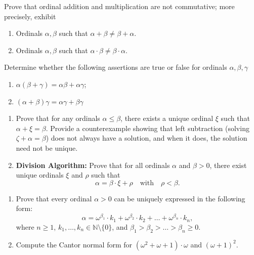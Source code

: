 \begin{exercise}
  Prove that ordinal addition and multiplication are not commutative;
  more precisely, exhibit
  \begin{enumerate}
  \item
    Ordinals $\alpha,\beta$ such that $\alpha+\beta\neq \beta+\alpha$.
  \item
    Ordinals $\alpha,\beta$ such that $\alpha\cdot\beta\neq \beta\cdot\alpha$.
  \end{enumerate}
\end{exercise}

\begin{exercise}
Determine whether the following assertions are true or false for ordinals $\alpha,\beta,\gamma$
  \begin{enumerate}
  \item
    $\alpha(\beta+\gamma)=\alpha\beta+\alpha\gamma$;
  \item
    $(\alpha+\beta)\gamma=\alpha\gamma+\beta\gamma$
  \end{enumerate}
\end{exercise}

\begin{exercise}\hfill
\begin{enumerate}
    \item Prove that for any ordinals $\alpha \le \beta$, there exists a unique ordinal $\xi$ such that $\alpha + \xi = \beta$. Provide a counterexample showing that left subtraction (solving $\zeta + \alpha = \beta$) does not always have a solution, and when it does, the solution need not be unique.
    \item \textbf{Division Algorithm:} Prove that for all ordinals $\alpha$ and $\beta > 0$, there exist unique ordinals $\xi$ and $\rho$ such that
    \[
    \alpha = \beta \cdot \xi + \rho \quad \text{with} \quad \rho < \beta.
    \]
\end{enumerate}
\end{exercise}

\begin{exercise}\hfill
\begin{enumerate}
    \item Prove that every ordinal $\alpha > 0$ can be uniquely expressed in the following form:
    \[
    \alpha = \omega^{\beta_1} \cdot k_1 + \omega^{\beta_2} \cdot k_2 + \dots + \omega^{\beta_n} \cdot k_n,
    \]
    where $n \ge 1$, $k_1, \dots, k_n \in \mathbb{N} \setminus \{0\}$, and $\beta_1 > \beta_2 > \dots > \beta_n \ge 0$.
    \item Compute the Cantor normal form for $(\omega^2 + \omega + 1) \cdot \omega$ and $(\omega + 1)^2$.
\end{enumerate}
\end{exercise}

